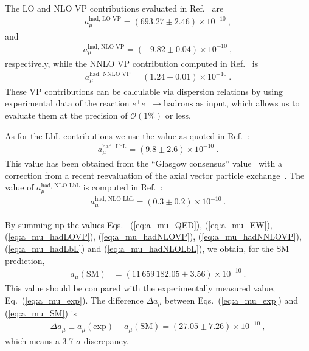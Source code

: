 The LO and NLO VP contributions evaluated in Ref.~\cite{KNT18}
are 
%
\begin{align}
 a_\mu^{\text{had, LO VP}}= (693.27 \pm 2.46) \times 10^{-10}~, 
\label{eq:a_mu_hadLOVP}
\end{align}
%
and
%
\begin{align}
a_\mu^{\text{had, NLO VP}}= (-9.82 \pm 0.04) \times 10^{-10}~, 
\label{eq:a_mu_hadNLOVP}
\end{align}
%
respectively, while the NNLO VP contribution computed 
in Ref.~\cite{Kurz-etal-hadNNLO} is
%
\begin{align}
a_\mu^{\text{had, NNLO VP}}= (1.24 \pm 0.01) \times 10^{-10}~.
\label{eq:a_mu_hadNNLOVP}
\end{align}
%
These VP contributions can be calculable via dispersion relations
by using experimental data of the reaction
$e^+e^- \to \text{hadrons}$ as input, 
which allows us to evaluate them at the precision of 
${\mathcal O}(1\%)$ or less.

As for the LbL contributions we use the value
as quoted in Ref.~\cite{KNT18}: 
%
%
\begin{align}
a_\mu^{\text{had, LbL}}= (9.8 \pm 2.6) \times 10^{-10}~.
\label{eq:a_mu_hadLbL}
\end{align}
%
This value has been obtained from the ``Glasgow consensus''
value~\cite{Prades:2009tw} with a correction from a recent reevaluation
of the axial vector particle exchange~\cite{Jegerlehner:2015stw,Pauk:2014rta}.
The value of $a_\mu^{\text{had, NLO LbL}}$ is computed
in Ref.~\cite{Colangelo-etal-NLOLbL}:
%
\begin{align}
a_\mu^{\text{had, NLO LbL}}= (0.3 \pm 0.2) \times 10^{-10}~.
\label{eq:a_mu_hadNLOLbL}
\end{align}

By summing up the values Eqs.~
(\ref{eq:a_mu_QED}), (\ref{eq:a_mu_EW}), (\ref{eq:a_mu_hadLOVP}),
(\ref{eq:a_mu_hadNLOVP}), (\ref{eq:a_mu_hadNNLOVP}),
(\ref{eq:a_mu_hadLbL}) and (\ref{eq:a_mu_hadNLOLbL}), 
we obtain, for the SM prediction, 
%
\begin{align}
 a_\mu(\text{SM}) &= (11 \, 659 \, 182.05 \pm 3.56) \times 10^{-10}~.
\label{eq:a_mu_SM}
\end{align}
%
This value should be compared with the experimentally measured
value, Eq.~(\ref{eq:a_mu_exp}).
The difference $\Delta a_\mu$ between Eqs.~(\ref{eq:a_mu_exp})
and (\ref{eq:a_mu_SM}) is
% 
\begin{align}
 \Delta a_\mu \equiv a_\mu(\text{exp}) - a_\mu(\text{SM})
= (27.05 \pm 7.26) \times 10^{-10}~,
\label{eq:delta_a_mu}
\end{align}
%
which means a 3.7 $\sigma$ discrepancy.

